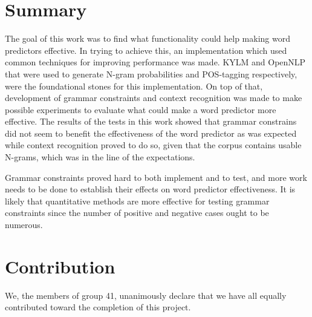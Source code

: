 \section{Summary}
The goal of this work was to find what functionality could help making word predictors effective. In trying to achieve this, an implementation which used common techniques for improving performance was made. KYLM and OpenNLP that were used to generate N-gram probabilities and POS-tagging respectively, were the foundational stones for this implementation. On top of that, development of grammar constraints and context recognition was made to make possible experiments to evaluate what could make a word predictor more effective. The results of the tests in this work showed that grammar constrains did not seem to benefit the effectiveness of the word predictor as was expected while context recognition proved to do so, given that the corpus contains usable N-grams, which was in the line of the expectations.

Grammar constraints proved hard to both implement and to test, and more work needs to be done to establish their effects on word predictor effectiveness. It is likely that quantitative methods are more effective for testing grammar constraints since the number of positive and negative cases ought to be numerous.
  
\section{Contribution}
We, the members of group 41, unanimously declare that we have all equally contributed toward the completion of this project.
